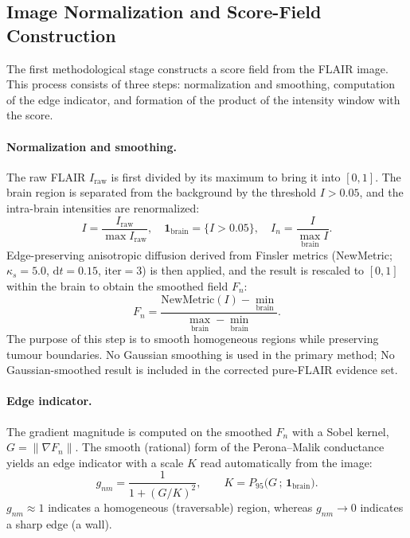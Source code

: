 \documentclass[11pt,a4paper]{article}
\begin{document}
\subsection{Image Normalization and Score-Field Construction}\label{sec:score-setup}

The first methodological stage constructs a score field from the FLAIR image.
This process consists of three steps: normalization and smoothing, computation of
the edge indicator, and formation of the product of the intensity window with the
score.

\paragraph{Normalization and smoothing.} The raw FLAIR $I_{\text{raw}}$ is first
divided by its maximum to bring it into $[0,1]$. The brain region is separated
from the background by the threshold $I > 0.05$, and the intra-brain intensities
are renormalized:
\begin{equation}
I=\frac{I_{\text{raw}}}{\max I_{\text{raw}}},\quad
\mathbf{1}_{\text{brain}}=\{I>0.05\},\quad
I_n=\frac{I}{\max_{\text{brain}} I}.
\label{eq:norm}
\end{equation}
Edge-preserving anisotropic diffusion derived from Finsler metrics (NewMetric;
$\kappa_s=5.0$, $\mathrm{d}t=0.15$, $\text{iter}=3$) is then applied, and the
result is rescaled to $[0,1]$ within the brain to obtain the smoothed field
$F_n$:
\begin{equation}
F_n=\frac{\text{NewMetric}(I)-\min_{\text{brain}}}{\max_{\text{brain}}-\min_{\text{brain}}}.
\label{eq:fn}
\end{equation}
The purpose of this step is to smooth homogeneous regions while preserving tumour
boundaries. No Gaussian smoothing is used in the primary method;
No Gaussian-smoothed result is included in the corrected pure-FLAIR evidence set.

\paragraph{Edge indicator.} The gradient magnitude is computed on the smoothed
$F_n$ with a Sobel kernel, $G=\lVert\nabla F_n\rVert$. The smooth (rational) form
of the Perona--Malik conductance~\cite{peronamalik1990} yields an edge indicator
with a scale $K$ read automatically from the image:
\begin{equation}
g_{nm}=\frac{1}{1+(G/K)^2},\qquad K=P_{95}\big(G\,;\,\mathbf{1}_{\text{brain}}\big).
\label{eq:gnm}
\end{equation}
$g_{nm}\approx 1$ indicates a homogeneous (traversable) region, whereas
$g_{nm}\to 0$ indicates a sharp edge (a wall).
\end{document}

